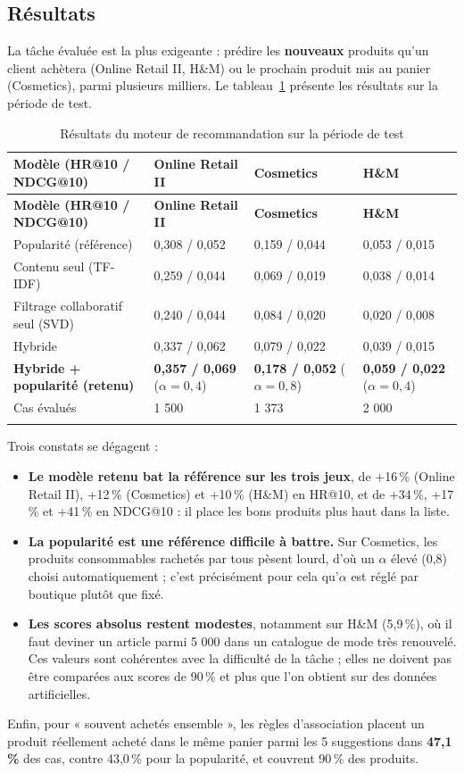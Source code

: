 \subsection{Résultats}
La tâche évaluée est la plus exigeante : prédire les \textbf{nouveaux} produits qu'un client achètera (Online Retail II, H\&M) ou le prochain produit mis au panier (Cosmetics), parmi plusieurs milliers. Le tableau~\ref{tab:resultats-reco} présente les résultats sur la période de test.

\renewcommand{\arraystretch}{1.3}
\begin{longtable}{|p{5.2cm}|p{2.9cm}|p{2.9cm}|p{2.9cm}|}
\hline
\textbf{Modèle (HR@10 / NDCG@10)} & \textbf{Online Retail II} & \textbf{Cosmetics} & \textbf{H\&M} \\
\hline
\endfirsthead
\hline
\textbf{Modèle (HR@10 / NDCG@10)} & \textbf{Online Retail II} & \textbf{Cosmetics} & \textbf{H\&M} \\
\hline
\endhead
Popularité (référence) & 0,308 / 0,052 & 0,159 / 0,044 & 0,053 / 0,015 \\
\hline
Contenu seul (TF-IDF) & 0,259 / 0,044 & 0,069 / 0,019 & 0,038 / 0,014 \\
\hline
Filtrage collaboratif seul (SVD) & 0,240 / 0,044 & 0,084 / 0,020 & 0,020 / 0,008 \\
\hline
Hybride & 0,337 / 0,062 & 0,079 / 0,022 & 0,039 / 0,015 \\
\hline
\textbf{Hybride + popularité (retenu)} & \textbf{0,357 / 0,069} ($\alpha=0{,}4$) & \textbf{0,178 / 0,052} ($\alpha=0{,}8$) & \textbf{0,059 / 0,022} ($\alpha=0{,}4$) \\
\hline
Cas évalués & 1 500 & 1 373 & 2 000 \\
\hline
\caption{Résultats du moteur de recommandation sur la période de test}
\label{tab:resultats-reco}
\end{longtable}

Trois constats se dégagent :
\begin{itemize}
  \item \textbf{Le modèle retenu bat la référence sur les trois jeux}, de +16\,\% (Online Retail II), +12\,\% (Cosmetics) et +10\,\% (H\&M) en HR@10, et de +34\,\%, +17\,\% et +41\,\% en NDCG@10 : il place les bons produits plus haut dans la liste.
  \item \textbf{La popularité est une référence difficile à battre.} Sur Cosmetics, les produits consommables rachetés par tous pèsent lourd, d'où un $\alpha$ élevé (0,8) choisi automatiquement ; c'est précisément pour cela qu'$\alpha$ est réglé par boutique plutôt que fixé.
  \item \textbf{Les scores absolus restent modestes}, notamment sur H\&M (5,9\,\%), où il faut deviner un article parmi 5 000 dans un catalogue de mode très renouvelé. Ces valeurs sont cohérentes avec la difficulté de la tâche ; elles ne doivent pas être comparées aux scores de 90\,\% et plus que l'on obtient sur des données artificielles.
\end{itemize}
Enfin, pour « souvent achetés ensemble », les règles d'association placent un produit réellement acheté dans le même panier parmi les 5 suggestions dans \textbf{47,1\,\%} des cas, contre 43,0\,\% pour la popularité, et couvrent 90\,\% des produits.


